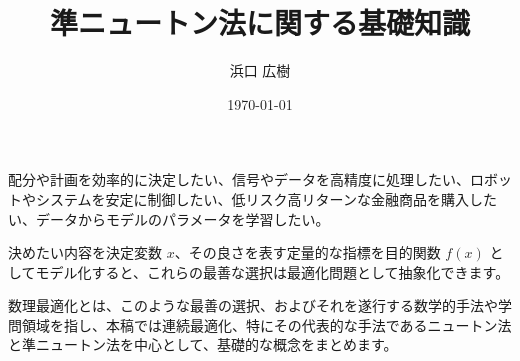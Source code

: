 \documentclass[11pt]{article}
\newif\ifEn
\begin{document}
\ifEn
    \title{Fundamental Knowledge on Quasi-Newton Methods}
    \author{Hiroki Hamaguchi \orcidlink{0009-0005-7348-1356}}
\else
    \title{準ニュートン法に関する基礎知識}
    \author{浜口 広樹 }
\fi

\date{\today}
\maketitle

\ifEn
    We may wish to determine efficient allocations and plans, process signals and data accurately, control robots and systems stably, select low-risk and high-return financial products, or learn model parameters from data.
    When we model the decision to be made as a decision variable $x$ and a quantitative indicator representing its quality as an objective function $f(x)$, the best choice can be abstracted as an optimization problem.
    Mathematical optimization refers to such best choices, as well as the mathematical methods and academic fields for them. In this paper, we summarize the basic concepts of continuous optimization, particularly Newton's method and quasi-Newton methods, which are representative methods in this field.
\else
    配分や計画を効率的に決定したい、信号やデータを高精度に処理したい、ロボットやシステムを安定に制御したい、低リスク高リターンな金融商品を購入したい、データからモデルのパラメータを学習したい。

    決めたい内容を決定変数 $x$、その良さを表す定量的な指標を目的関数 $f(x)$ としてモデル化すると、これらの最善な選択は最適化問題として抽象化できます。

    数理最適化とは、このような最善の選択、およびそれを遂行する数学的手法や学問領域を指し、本稿では連続最適化、特にその代表的な手法であるニュートン法と準ニュートン法を中心として、基礎的な概念をまとめます。
\fi













\end{document}
